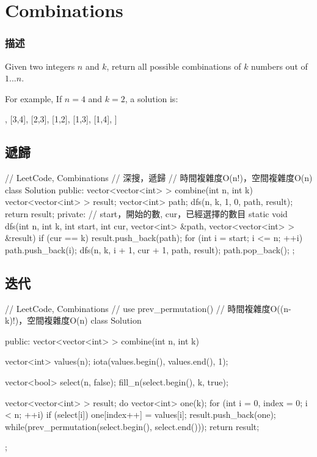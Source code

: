 \section{Combinations} %
\label{sec:combinations}


\subsubsection{描述}
Given two integers $n$ and $k$, return all possible combinations of $k$ numbers out of $1 ... n$.

For example,
If $n = 4$ and $k = 2$, a solution is:
\begin{Code}
[
  [2,4],
  [3,4],
  [2,3],
  [1,2],
  [1,3],
  [1,4],
]
\end{Code}


\subsection{遞歸}
\begin{Code}
// LeetCode, Combinations
// 深搜，遞歸
// 時間複雜度O(n!)，空間複雜度O(n)
class Solution {
public:
    vector<vector<int> > combine(int n, int k) {
        vector<vector<int> > result;
        vector<int> path;
        dfs(n, k, 1, 0, path, result);
        return result;
    }
private:
    // start，開始的數, cur，已經選擇的數目
    static void dfs(int n, int k, int start, int cur,
            vector<int> &path, vector<vector<int> > &result) {
        if (cur == k) {
            result.push_back(path);
        }
        for (int i = start; i <= n; ++i) {
            path.push_back(i);
            dfs(n, k, i + 1, cur + 1, path, result);
            path.pop_back();
        }
    }
};
\end{Code}


\subsection{迭代}
\begin{Code}
// LeetCode, Combinations
// use prev_permutation()
// 時間複雜度O((n-k)!)，空間複雜度O(n)
class Solution {
public:
    vector<vector<int> > combine(int n, int k) {
        vector<int> values(n);
        iota(values.begin(), values.end(), 1);

        vector<bool> select(n, false);
        fill_n(select.begin(), k, true);

        vector<vector<int> > result;
        do{
            vector<int> one(k);
            for (int i = 0, index = 0; i < n; ++i)
                if (select[i])
                    one[index++] = values[i];
            result.push_back(one);
        } while(prev_permutation(select.begin(), select.end()));
        return result;
    }
};
\end{Code}



